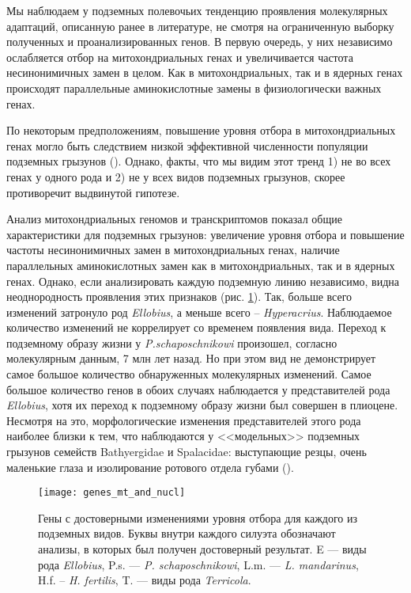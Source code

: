Мы наблюдаем у подземных полевочьих тенденцию проявления молекулярных адаптаций, описанную ранее в литературе, не смотря на ограниченную выборку полученных и проанализированных генов. В первую очередь, у них независимо ослабляется отбор на митохондриальных генах и увеличивается частота несинонимичных замен в целом. Как в митохондриальных, так и в ядерных генах происходят параллельные аминокислотные замены в физиологически важных генах. 


По некоторым предположениям, повышение уровня отбора в митохондриальных генах могло быть следствием низкой эффективной численности популяции подземных грызунов (\cite{Lacey2000}). Однако, факты, что мы видим этот тренд 1) не во всех генах у одного рода и 2) не у всех видов подземных грызунов, скорее противоречит выдвинутой гипотезе. 

Анализ митохондриальных геномов и транскриптомов показал общие характеристики для подземных грызунов: увеличение уровня отбора и повышение частоты несинонимичных замен в митохондриальных генах, наличие параллельных аминокислотных замен как в митохондриальных, так и в ядерных генах. Однако, если анализировать каждую подземную линию независимо, видна неоднородность проявления этих признаков (рис. \ref{Convergent_arv}). Так, больше всего изменений затронуло род \textit{Ellobius}, а меньше всего -- \textit{Hyperacrius}. Наблюдаемое количество изменений не коррелирует со временем появления вида. Переход к подземному образу жизни у \textit{P.schaposchnikowi} произошел, согласно молекулярным данным, 7 млн лет назад. Но при этом вид не демонстрирует самое большое количество обнаруженных молекулярных изменений. Самое большое количество генов в обоих случаях наблюдается у представителей рода \textit{Ellobius}, хотя их переход к подземному образу жизни был совершен в плиоцене. Несмотря на это, морфологические изменения представителей этого рода наиболее близки к тем, что наблюдаются у <<модельных>> подземных грызунов семейств Bathyergidae и Spalacidae: выступающие резцы, очень маленькие глаза и изолирование ротового отдела губами (\cite{Gromov1977}). 

\begin{figure}[h!]
	\begin{center}
		\texttt{[image: genes\_mt\_and\_nucl]}
	\end{center}
	\caption{Гены с достоверными изменениями уровня отбора для каждого из подземных видов. Буквы внутри каждого силуэта обозначают анализы, в которых был получен достоверный результат. E --- виды рода \textit{Ellobius}, P.s. --- \textit{P. schaposchnikowi}, L.m. --- \textit{L. mandarinus}, H.f. -- \textit{H. fertilis}, T. — виды рода \textit{Terricola}.} \label{Convergent_arv}
\end{figure}


